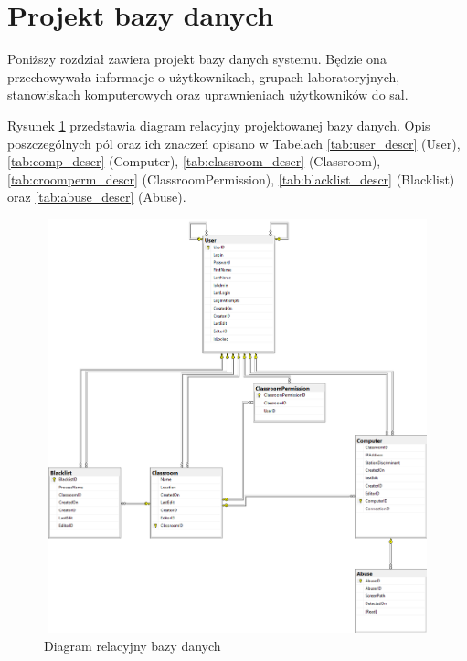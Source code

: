 \section{Projekt bazy danych}
Poniższy rozdział zawiera projekt bazy danych systemu. Będzie ona przechowywała informacje o użytkownikach, grupach laboratoryjnych, stanowiskach komputerowych oraz uprawnieniach użytkowników do sal. 

Rysunek \ref{fig:diag_rel} przedstawia diagram relacyjny projektowanej bazy danych. Opis poszczególnych pól oraz ich znaczeń opisano w Tabelach \ref{tab:user_descr} (User), \ref{tab:comp_descr} (Computer), \ref{tab:classroom_descr} (Classroom), \ref{tab:croomperm_descr} (ClassroomPermission), \ref{tab:blacklist_descr} (Blacklist) oraz \ref{tab:abuse_descr} (Abuse).

\begin{figure} [!ht]
    \centering
    \includegraphics[height=12cm,width=15cm]{diagram_relacyjny}
    \caption{Diagram relacyjny bazy danych}
    \label{fig:diag_rel}
\end{figure}




